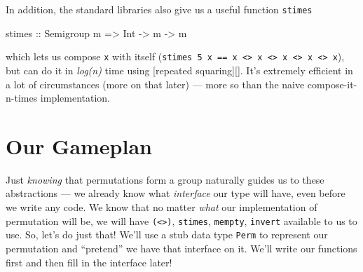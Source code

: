 \documentclass[]{article}
\newenvironment{Shaded}{}{}
\newcommand{\CommentTok}[1]{\textcolor[rgb]{0.38,0.63,0.69}{\textit{#1}}}
\newcommand{\DataTypeTok}[1]{\textcolor[rgb]{0.56,0.13,0.00}{#1}}
\newcommand{\DecValTok}[1]{\textcolor[rgb]{0.25,0.63,0.44}{#1}}
\newcommand{\FunctionTok}[1]{\textcolor[rgb]{0.02,0.16,0.49}{#1}}
\newcommand{\KeywordTok}[1]{\textcolor[rgb]{0.00,0.44,0.13}{\textbf{#1}}}
\newcommand{\NormalTok}[1]{#1}
\newcommand{\OperatorTok}[1]{\textcolor[rgb]{0.40,0.40,0.40}{#1}}
\newcommand{\OtherTok}[1]{\textcolor[rgb]{0.00,0.44,0.13}{#1}}
\begin{document}
In addition, the standard libraries also give us a useful function
\texttt{stimes}

\begin{Shaded}
\begin{Highlighting}[]
\OtherTok{stimes ::} \DataTypeTok{Semigroup}\NormalTok{ m }\OtherTok{=>} \DataTypeTok{Int} \OtherTok{{-}>}\NormalTok{ m }\OtherTok{{-}>}\NormalTok{ m}
\end{Highlighting}
\end{Shaded}

which lets us compose \texttt{x} with itself
(\texttt{stimes\ 5\ x\ ==\ x\ \textless{}\textgreater{}\ x\ \textless{}\textgreater{}\ x\ \textless{}\textgreater{}\ x\ \textless{}\textgreater{}\ x}),
but can do it in \emph{log(n)} time using {[}repeated squaring{]}{[}{]}. It's
extremely efficient in a lot of circumstances (more on that later) --- more so
than the naive compose-it-n-times implementation.

\hypertarget{our-gameplan}{%
\section{Our Gameplan}\label{our-gameplan}}

Just \emph{knowing} that permutations form a group naturally guides us to these
abstractions --- we already know what \emph{interface} our type will have, even
before we write any code. We know that no matter \emph{what} our implementation
of permutation will be, we will have \texttt{(\textless{}\textgreater{})},
\texttt{stimes}, \texttt{mempty}, \texttt{invert} available to us to use. So,
let's do just that! We'll use a stub data type \texttt{Perm} to represent our
permutation and ``pretend'' we have that interface on it. We'll write our
functions first and then fill in the interface later!

\begin{Shaded}
\end{Shaded}
\end{document}

